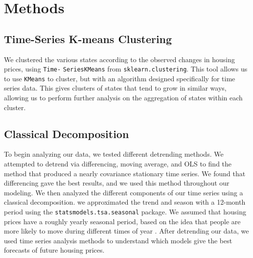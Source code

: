 \documentclass[11pt]{amsart}
\begin{document}

\section{Methods} 
 

\subsection{Time-Series K-means Clustering}
We clustered the various states according to the observed changes in housing prices, using \texttt{Time-} \texttt{SeriesKMeans} from \texttt{sklearn.clustering}. This tool allows us to use \texttt{KMeans} to cluster, but with an algorithm designed specifically for time series data.
This gives clusters of states that tend to grow in similar ways, allowing us to perform further analysis on the aggregation of states within each cluster.

\subsection{Classical Decomposition}
To begin analyzing our data, we tested different detrending methods. We attempted to detrend via differencing, moving average, and OLS to find the method that produced a nearly covariance stationary time series. 
We found that differencing gave the best results, and we used this method throughout our modeling. %
We then analyzed the different components of our time series using a classical decomposition. we approximated the trend and season with a 12-month period using the \texttt{statsmodels.tsa.seasonal} package.
We assumed that housing prices have a roughly yearly seasonal period, based on the idea that people are more likely to move during different times of year \cite{seasonal}.
After detrending our data, we used time series analysis methods to understand which models give the best forecasts of future housing prices.
\end{document}
